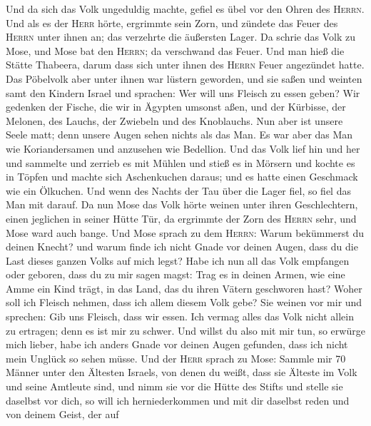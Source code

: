  Und da sich das Volk ungeduldig machte, gefiel es übel
vor den Ohren des \textsc{Herrn}. Und als es der \textsc{Herr} hörte,
ergrimmte sein Zorn, und zündete das Feuer des \textsc{Herrn} unter
ihnen an; das verzehrte die äußersten Lager.  Da schrie
das Volk zu Mose, und Mose bat den \textsc{Herrn}; da verschwand das
Feuer.  Und man hieß die Stätte Thabeera, darum dass sich
unter ihnen des \textsc{Herrn} Feuer angezündet hatte. 
Das Pöbelvolk aber unter ihnen war lüstern geworden, und sie saßen und
weinten samt den Kindern Israel und sprachen: Wer will uns Fleisch zu
essen geben?  Wir gedenken der Fische, die wir in Ägypten
umsonst aßen, und der Kürbisse, der Melonen, des Lauchs, der Zwiebeln
und des Knoblauchs.  Nun aber ist unsere Seele matt; denn
unsere Augen sehen nichts als das Man.  Es war aber das
Man wie Koriandersamen und anzusehen wie Bedellion.  Und
das Volk lief hin und her und sammelte und zerrieb es mit Mühlen und
stieß es in Mörsern und kochte es in Töpfen und machte sich Aschenkuchen
daraus; und es hatte einen Geschmack wie ein Ölkuchen. 
Und wenn des Nachts der Tau über die Lager fiel, so fiel das Man mit
darauf.  Da nun Mose das Volk hörte weinen unter ihren
Geschlechtern, einen jeglichen in seiner Hütte Tür, da ergrimmte der
Zorn des \textsc{Herrn} sehr, und Mose ward auch bange. 
Und Mose sprach zu dem \textsc{Herrn}: Warum bekümmerst du deinen
Knecht? und warum finde ich nicht Gnade vor deinen Augen, dass du die
Last dieses ganzen Volks auf mich legst?  Habe ich nun
all das Volk empfangen oder geboren, dass du zu mir sagen magst: Trag es
in deinen Armen, wie eine Amme ein Kind trägt, in das Land, das du ihren
Vätern geschworen hast?  Woher soll ich Fleisch nehmen,
dass ich allem diesem Volk gebe? Sie weinen vor mir und sprechen: Gib
uns Fleisch, dass wir essen.  Ich vermag alles das Volk
nicht allein zu ertragen; denn es ist mir zu schwer.  Und
willst du also mit mir tun, so erwürge mich lieber, habe ich anders
Gnade vor deinen Augen gefunden, dass ich nicht mein Unglück so sehen
müsse.  Und der \textsc{Herr} sprach zu Mose: Sammle mir
70 Männer unter den Ältesten Israels, von denen du weißt, dass sie
Älteste im Volk und seine Amtleute sind, und nimm sie vor die Hütte des
Stifts und stelle sie daselbst vor dich,  so will ich
herniederkommen und mit dir daselbst reden und von deinem Geist, der auf
